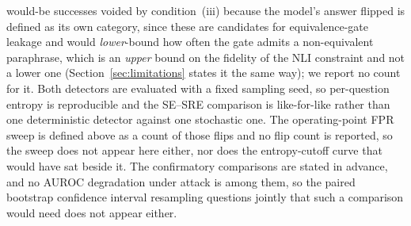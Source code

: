 would-be successes voided by condition~(iii) because the
model's answer flipped is defined as its own category, since these are candidates for
equivalence-gate leakage and would \emph{lower}-bound how often the gate admits a
non-equivalent paraphrase, which is an
\emph{upper} bound on the fidelity of the NLI constraint and not a lower one
(Section~\ref{sec:limitations} states it the same way); we report no count for it. Both detectors are evaluated
with a fixed sampling seed, so per-question entropy is reproducible and the
SE--SRE comparison is like-for-like rather than one deterministic detector against
one stochastic one. The operating-point FPR sweep is defined above as a count of those flips
and no flip count is reported, so the sweep does not appear here either, nor does the
entropy-cutoff curve that would have sat beside it. The confirmatory comparisons are stated
in advance, and no AUROC degradation
under attack is among them, so the paired bootstrap confidence interval resampling questions
jointly that such a comparison would need does not appear either.

